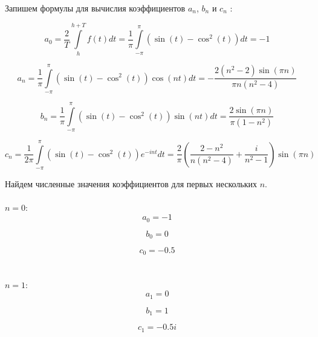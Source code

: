 \documentclass[a5paper, 10pt]{article}
\theoremstyle{definition}
\theoremstyle{plain}
\theoremstyle{remark}
\begin{document}
Запишем формулы для вычислия коэффициентов $a_n$, $b_n$ и $c_n$ :

\begin{equation}
a_0 =  \frac{2}{T} \int \limits_{h}^{h + T} f(t) dt =   \frac{1}{\pi} \int \limits_{-\pi}^{\pi} \left( \sin(t) - \cos^2(t) \right) dt = -1
\end{equation}


\begin{equation}
a_n =  \frac{1}{\pi} \int \limits_{-\pi}^{\pi} \left( \sin(t) - \cos^2(t) \right) \cos (nt) dt = -\frac{2(n^2 - 2)\sin(\pi n)}{\pi n (n^2 - 4)}
\end{equation}

\begin{equation}
b_n  =  \frac{1}{\pi} \int \limits_{-\pi}^{\pi} \left( \sin(t) - \cos^2(t) \right) \sin (nt) dt  = \frac{2 \sin (\pi n)}{\pi (1 - n^2)}
\end{equation}

\begin{equation}
c_n =  \frac{1}{2 \pi} \int \limits_{-\pi}^{\pi} \left( \sin(t) - \cos^2(t) \right) e^{-i n t} dt  = \frac{2 }{\pi} \left( \frac{2 - n^2}{n(n^2 - 4)} + \frac{i}{n^2 - 1} \right) \sin (\pi n)
\end{equation}

Найдем численные значения коэффициентов для первых нескольких $n$. \\
\\
$n = 0:$
\begin{equation}
a_0  = -1
\end{equation}

\begin{equation}
b_0  = 0
\end{equation}

\begin{equation}
c_0  = -0.5
\end{equation}
\\
\\

$n = 1:$
\begin{equation}
a_1 = 0
\end{equation}

\begin{equation}
b_1 =  1
\end{equation}

\begin{equation}
c_1  = -0.5 i
\end{equation}
\\
\\
\end{document}
